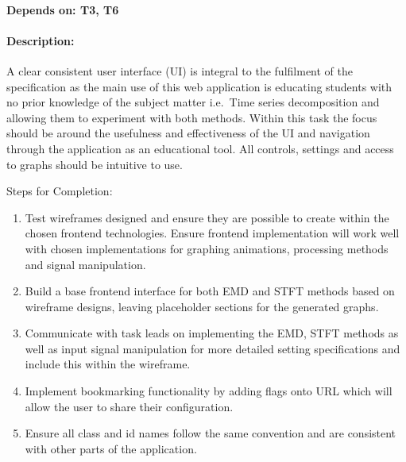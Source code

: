 \documentclass[
  english,
  paper=a4,
  oneside  ,captions=tableheading
]{scrbook}
\begin{document}
\hypertarget{depends-on-t3-t6-1}{%
\paragraph{Depends on: T3, T6}\label{depends-on-t3-t6-1}}

\hypertarget{description-6}{%
\paragraph{Description:}\label{description-6}}

A clear consistent user interface (UI) is integral to the fulfilment of
the specification as the main use of this web application is educating
students with no prior knowledge of the subject matter i.e.~Time series
decomposition and allowing them to experiment with both methods. Within
this task the focus should be around the usefulness and effectiveness of
the UI and navigation through the application as an educational tool.
All controls, settings and access to graphs should be intuitive to use.

Steps for Completion: 

\begin{enumerate}
	\item Test wireframes designed and ensure they are possible to create within the chosen frontend technologies. Ensure frontend implementation will work well with chosen implementations for graphing animations, processing methods and signal manipulation.
	\item  Build a base frontend interface for both EMD and STFT methods based on wireframe designs, leaving placeholder sections for the generated graphs.
	\item Communicate with task leads on implementing the EMD, STFT methods as well as input signal manipulation for more detailed setting specifications and include this within the wireframe.
	\item Implement bookmarking functionality by adding flags onto URL which will allow the user to share their configuration.
	\item Ensure all class and id names follow the same convention and are consistent with other parts of the application.
\end{enumerate}
\end{document}
